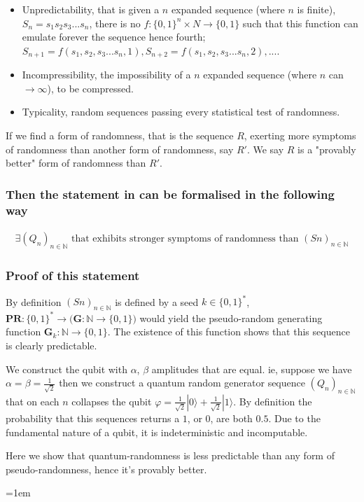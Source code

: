 \documentclass{article}
\begin{document}
\begin{itemize}
	\item Unpredictability, that is given a $n$ expanded sequence (where $n$ is finite), $S_n=s_1s_2s_3...s_n$, there is no $f: \{0,1\}^n \times N \rightarrow \{0,1\}$ such that this function can emulate forever the sequence hence fourth; $S_{n+1} = f(s_1,s_2,s_3...s_n, 1), S_{n+2} = f(s_1,s_2,s_3...s_n, 2), ...$.
	\item Incompressibility, the impossibility of a $n$ expanded sequence (where $n$ can $\rightarrow \infty$), to be compressed.
	\item Typicality, random sequences passing every statistical test of randomness.
\end{itemize}

If we find a form of randomness, that is the sequence $R$, exerting more symptoms of randomness than another form of randomness, say $R'$. We say $R$ is a "provably better" form of randomness than $R'$.

\subsubsection*{Then the statement in can be formalised in the following way}
\begin{align*}
	\exists (Q_n)_{n \in \mathbb{N}} \text{ that exhibits stronger symptoms of randomness than } (Sn)_{n\in\mathbb{N}}
\end{align*}

\subsubsection*{Proof of this statement}
By definition $(Sn)_{n\in\mathbb{N}}$ is defined by a seed $k \in \{0,1\}^*$, $\bm{PR}: \{0,1\}^* \rightarrow \bigl(\bm{G}: \mathbb{N} \rightarrow \{0,1\}\bigr)$ would yield the pseudo-random generating function $\bm{G}_k: \mathbb{N} \rightarrow \{0,1\}$. The existence of this function shows that this sequence is clearly predictable.

We construct the qubit with $\alpha$, $\beta$ amplitudes that are equal. ie, suppose we have $\alpha = \beta = \frac{1}{\sqrt{2}}$ then we construct a quantum random generator sequence $(Q_n)_{n \in \mathbb{N}}$ that on each $n$ collapses the qubit $\varphi = \frac{1}{\sqrt{2}} | 0\rangle + \frac{1}{\sqrt{2}} | 1\rangle$. By definition the probability that this sequences returns a $1$, or $0$, are both $0.5$. Due to the fundamental nature of a qubit, it is indeterministic and incomputable.

Here we show that quantum-randomness is less predictable than any form of pseudo-randomness, hence it's provably better.

\emergencystretch=1em
\printbibliography
\end{document}
